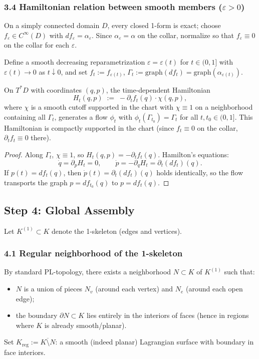 \subsubsection*{3.4 Hamiltonian relation between smooth members ($\varepsilon>0$)}
On a simply connected domain $D$, every closed 1-form is exact; choose
$f_\varepsilon\in C^\infty(D)$ with $df_\varepsilon=\alpha_\varepsilon$.
Since $\alpha_\varepsilon=\alpha$ on the collar, normalize so that
$f_\varepsilon\equiv 0$ on the collar for each $\varepsilon$.

Define a smooth decreasing reparametrization $\varepsilon=\varepsilon(t)$ for $t\in(0,1]$
with $\varepsilon(t)\to 0$ as $t\downarrow 0$, and set $f_t:=f_{\varepsilon(t)}$,
$\Gamma_t:=\mathrm{graph}(df_t)=\mathrm{graph}(\alpha_{\varepsilon(t)})$.

\begin{proposition}\label{prop:q8-local-ham}
On $T^*D$ with coordinates $(q,p)$, the time-dependent Hamiltonian
\[
H_t(q,p) \;:=\; -\partial_t f_t(q)\cdot\chi(q,p),
\]
where $\chi$ is a smooth cutoff supported in the chart with $\chi\equiv 1$ on a
neighborhood containing all $\Gamma_t$, generates a flow $\phi_t$ with
$\phi_t(\Gamma_{t_0})=\Gamma_t$ for all $t,t_0\in(0,1]$.
This Hamiltonian is compactly supported in the chart
(since $f_t\equiv 0$ on the collar, $\partial_t f_t\equiv 0$ there).
\end{proposition}

\begin{proof}
Along $\Gamma_t$, $\chi\equiv 1$, so $H_t(q,p)=-\partial_t f_t(q)$.
Hamilton's equations:
\[
\dot q = \partial_p H_t = 0,\qquad
\dot p = -\partial_q H_t = \partial_t(df_t)(q).
\]
If $p(t)=df_t(q)$, then $\dot p(t)=\partial_t(df_t)(q)$ holds identically,
so the flow transports the graph $p=df_{t_0}(q)$ to $p=df_t(q)$.
\end{proof}


\subsection*{Step 4: Global Assembly}

Let $K^{(1)}\subset K$ denote the 1-skeleton (edges and vertices).

\subsubsection*{4.1 Regular neighborhood of the 1-skeleton}
By standard PL-topology, there exists a neighborhood $N\subset K$ of $K^{(1)}$ such that:
\begin{itemize}
\item $N$ is a union of pieces $N_v$ (around each vertex) and $N_e$ (around each open edge);
\item the boundary $\partial N\subset K$ lies entirely in the interiors of faces
  (hence in regions where $K$ is already smooth/planar).
\end{itemize}
Set $K_{\mathrm{reg}}:=\overline{K\setminus N}$: a smooth (indeed planar) Lagrangian surface
with boundary in face interiors.

